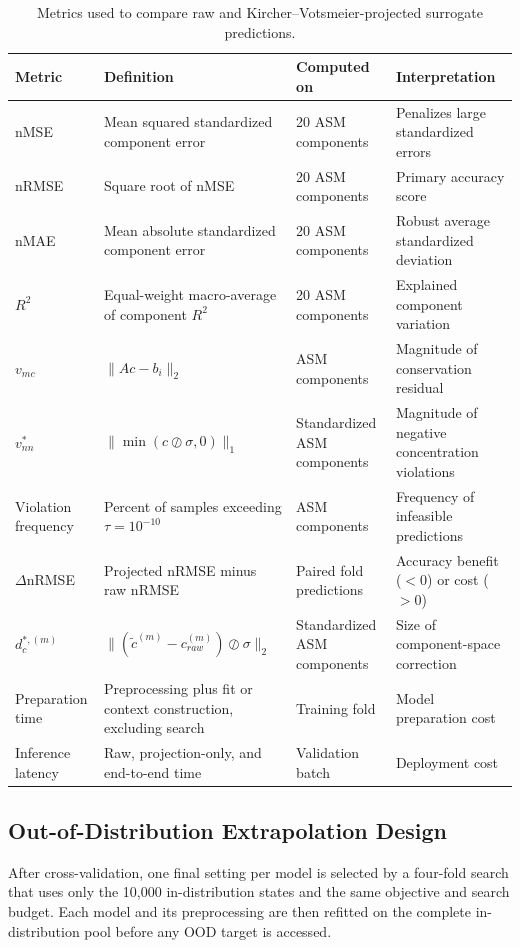 \documentclass[a4paper,fleqn]{cas-sc}
\begin{document}
\begin{table}[htbp]
\centering
\caption{Metrics used to compare raw and Kircher--Votsmeier-projected surrogate predictions.}
\label{tab:evaluation_metrics}
\scriptsize
\setlength{\tabcolsep}{3pt}
\begin{tabular}{p{2.3cm}p{3.5cm}p{2.4cm}p{2.4cm}}
\hline
Metric & Definition & Computed on & Interpretation \\
\hline
nMSE & Mean squared standardized component error & 20 ASM components & Penalizes large standardized errors \\
nRMSE & Square root of nMSE & 20 ASM components & Primary accuracy score \\
nMAE & Mean absolute standardized component error & 20 ASM components & Robust average standardized deviation \\
$R^2$ & Equal-weight macro-average of component $R^2$ & 20 ASM components & Explained component variation \\
$v_{mc}$ & $\|Ac-b_i\|_2$ & ASM components & Magnitude of conservation residual \\
$v_{nn}^{*}$ & $\|\min(c\oslash\sigma,0)\|_1$ & Standardized ASM components & Magnitude of negative concentration violations \\
Violation frequency & Percent of samples exceeding $\tau=10^{-10}$ & ASM components & Frequency of infeasible predictions \\
$\Delta$nRMSE & Projected nRMSE minus raw nRMSE & Paired fold predictions & Accuracy benefit ($<0$) or cost ($>0$) \\
$d_c^{*,(m)}$ & $\|(\tilde c^{(m)}-c_{raw}^{(m)})\oslash\sigma\|_2$ & Standardized ASM components & Size of component-space correction \\
Preparation time & Preprocessing plus fit or context construction, excluding search & Training fold & Model preparation cost \\
Inference latency & Raw, projection-only, and end-to-end time & Validation batch & Deployment cost \\
\hline
\end{tabular}
\end{table}

\subsection{Out-of-Distribution Extrapolation Design}

After cross-validation, one final setting per model is selected by a four-fold search that uses only the 10,000 in-distribution states and the same objective and search budget. Each model and its preprocessing are then refitted on the complete in-distribution pool before any OOD target is accessed.
\end{document}
